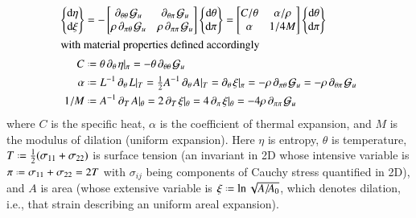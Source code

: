 \begin{subequations}
    \label{uniformMembraneModel}
    \begin{align}
\left\{ \begin{matrix}
\mathrm{d} \eta \\ \mathrm{d} \xi
\end{matrix} \right\} & = -\begin{bmatrix}
\partial_{\theta\theta\,} \mathcal{G}_u & \partial_{\theta\pi\,} \mathcal{G}_u \\
\rho \, \partial_{\pi\theta\,} \mathcal{G}_u & \rho \, \partial_{\pi\pi\,} \mathcal{G}_u
\end{bmatrix} 
\left\{ \begin{matrix}
\mathrm{d} \theta \\ \mathrm{d} \pi
\end{matrix} \right\} = \begin{bmatrix}
C / \theta & \alpha / \rho \\ \alpha & 1 / 4 M
\end{bmatrix} \left\{ \begin{matrix}
\mathrm{d} \theta \\ \mathrm{d} \pi
\end{matrix} \right\}
\label{thermoelasticCE2D} \\
\intertext{with material properties defined accordingly}
    C & \defeq \theta \, \partial_{\theta\,} \eta |_{\pi} = -\theta \, \partial_{\theta\theta\,} \mathcal{G}_u \\
    \alpha & \defeq L^{-1} \, \partial_{\theta\,} L |_T = \tfrac{1}{2} A^{-1} \, \partial_{\theta\,} A |_T = \partial_{\theta\,} \xi |_{\pi} = -\rho \, \partial_{\pi\theta\,} \mathcal{G}_u = -\rho \, \partial_{\theta\pi\,} \mathcal{G}_u \\
    1/M & \defeq A^{-1} \, \partial_{T\,} A |_{\theta} = 2 \, \partial_{T\,} \xi |_{\theta} = 4 \, \partial_{\pi\,} \xi |_{\theta} = -4\rho \, \partial_{\pi\pi\,} \mathcal{G}_u
    \end{align}
\end{subequations}
where $C$ is the specific heat, $\alpha$ is the coefficient of thermal expansion, and $M$ is the modulus of dilation (uniform expansion).  Here $\eta$ is entropy, $\theta$ is temperature, $T \defeq \tfrac{1}{2} ( \sigma_{11} + \sigma_{22})$ is surface tension (an invariant in 2D whose intensive variable is $\pi \defeq \sigma_{11} + \sigma_{22} = 2T$ with $\sigma_{ij}$ being components of Cauchy stress quantified in 2D), and $A$ is area (whose extensive variable is $\xi \defeq \ln \sqrt{A / \! A_0}$, which denotes dilation, i.e., that strain describing an uniform areal expansion).  

